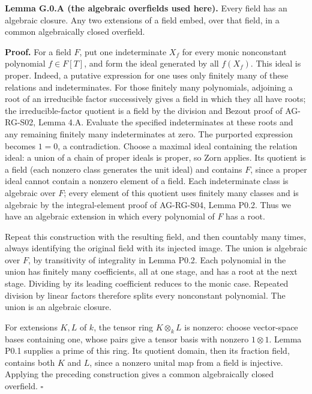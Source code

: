 \documentclass[11pt,a4paper,openany]{report}
\begin{document}
\label{AG-RG-S08-algebraic-overfields}

\textbf{Lemma G.0.A (the algebraic overfields used here).} Every field has an algebraic closure. Any two extensions of a field embed, over that field, in a common algebraically closed overfield.

\textbf{Proof.} For a field \(F\), put one indeterminate \(X_f\) for every monic nonconstant polynomial \(f\in F[T]\), and form the ideal generated by all \(f(X_f)\). This ideal is proper. Indeed, a putative expression for one uses only finitely many of these relations and indeterminates. For those finitely many polynomials, adjoining a root of an irreducible factor successively gives a field in which they all have roots; the irreducible-factor quotient is a field by the division and Bezout proof of AG-RG-S02, Lemma 4.A. Evaluate the specified indeterminates at these roots and any remaining finitely many indeterminates at zero. The purported expression becomes \(1=0\), a contradiction. Choose a maximal ideal containing the relation ideal: a union of a chain of proper ideals is proper, so Zorn applies. Its quotient is a field (each nonzero class generates the unit ideal) and contains \(F\), since a proper ideal cannot contain a nonzero element of a field. Each indeterminate class is algebraic over \(F\); every element of this quotient uses finitely many classes and is algebraic by the integral-element proof of AG-RG-S04, Lemma P0.2. Thus we have an algebraic extension in which every polynomial of \(F\) has a root.

Repeat this construction with the resulting field, and then countably many times, always identifying the original field with its injected image. The union is algebraic over \(F\), by transitivity of integrality in Lemma P0.2. Each polynomial in the union has finitely many coefficients, all at one stage, and has a root at the next stage. Dividing by its leading coefficient reduces to the monic case. Repeated division by linear factors therefore splits every nonconstant polynomial. The union is an algebraic closure.

For extensions \(K,L\) of \(k\), the tensor ring \(K\otimes_k L\) is nonzero: choose vector-space bases containing one, whose pairs give a tensor basis with nonzero \(1\otimes1\). Lemma P0.1 supplies a prime of this ring. Its quotient domain, then its fraction field, contains both \(K\) and \(L\), since a nonzero unital map from a field is injective. Applying the preceding construction gives a common algebraically closed overfield. \(\square\)
\end{document}
